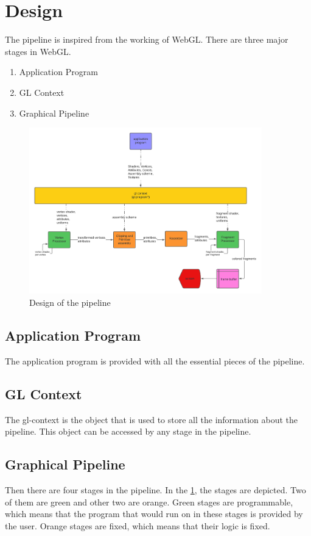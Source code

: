 \documentclass[a4paper]{article}
\theoremstyle{mytheoremstyle}
\theoremstyle{mytheoremstyle}
\theoremstyle{myproblemstyle}
\begin{document}
\section{Design}

The pipeline is inspired from the working of WebGL. There are three major stages in WebGL.
\begin{enumerate}
    \item Application Program
    \item GL Context
    \item Graphical Pipeline
\end{enumerate}

\begin{figure}[h]
    \center
    \includegraphics[width=0.9\textwidth]{pipeline-design.png}
    \caption{Design of the pipeline}
    \label{pipeline}
\end{figure}

\subsection{Application Program}
The application program is provided with all the essential pieces of the pipeline.
\subsection{GL Context}
The gl-context is the object that is used to store all the information about the pipeline. This object can be accessed by any stage in the pipeline.

\subsection{Graphical Pipeline}
Then there are four stages in the pipeline. In the \ref{pipeline}, the stages are depicted. Two of them are green and other two are orange. Green stages are programmable, which means that the program that would run on in these stages is provided by the user. Orange stages are fixed, which means that their logic is fixed.
\end{document}
